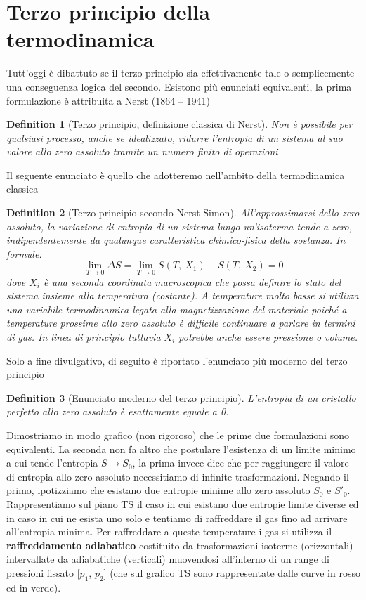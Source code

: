 \documentclass[10pt,a4paper]{article}
\newtheorem{definition}{Definition}
\begin{document}
\section{Terzo principio della termodinamica}\label{sec:terzo_principio}
Tutt'oggi è dibattuto se il terzo principio sia effettivamente tale o semplicemente una conseguenza logica del secondo. Esistono più enunciati equivalenti, la prima formulazione è attribuita a Nerst (1864 – 1941)
\begin{definition}[Terzo principio, definizione classica di Nerst]
	Non è possibile per qualsiasi processo, anche se idealizzato, ridurre l'entropia di un sistema al suo valore allo zero assoluto tramite un numero finito di operazioni 
\end{definition}
Il seguente enunciato è quello che adotteremo nell'ambito della termodinamica classica
\begin{definition}[Terzo principio secondo Nerst-Simon]
	All’approssimarsi dello zero assoluto, la variazione di entropia di un sistema lungo un’isoterma tende a zero, indipendentemente da qualunque caratteristica chimico-fisica della sostanza. In formule:
	\[\lim_{T\to 0} \Delta S = \lim_{T\to 0} S(T,\ X_1)-S(T,\ X_2) = 0\]
	dove \(X_i\) è una seconda coordinata macroscopica che possa definire lo stato del sistema insieme alla temperatura (costante). A temperature molto basse si utilizza una variabile termodinamica legata alla magnetizzazione del materiale poiché a temperature prossime allo zero assoluto è difficile continuare a parlare in termini di gas. In linea di principio tuttavia \(X_i \) potrebbe anche essere pressione o volume. 
\end{definition}
Solo a fine divulgativo, di seguito è riportato l'enunciato più moderno del terzo principio
\begin{definition}[Enunciato moderno del terzo principio]
	L'entropia di un cristallo perfetto allo zero assoluto è esattamente eguale a 0.
\end{definition}
Dimostriamo in modo grafico (non rigoroso) che le prime due formulazioni sono equivalenti. La seconda non fa altro che postulare l'esistenza di un limite minimo a cui tende l'entropia \(S\to S_0\), la prima invece dice che per raggiungere il valore di entropia allo zero assoluto necessitiamo di infinite trasformazioni. Negando il primo, ipotizziamo che esistano due entropie minime allo zero assoluto \(S_0\) e \(S'_0\). Rappresentiamo sul piano TS il caso in cui esistano due entropie limite diverse ed in caso in cui ne esista uno solo e tentiamo di raffreddare il gas fino ad arrivare all'entropia minima. Per raffreddare a queste temperature i gas si utilizza il \textbf{raffreddamento adiabatico} costituito da trasformazioni isoterme (orizzontali) intervallate da adiabatiche (verticali) muovendosi all'interno di un range di pressioni fissato [\(p_1\), \(p_2\)] (che sul grafico TS sono rappresentate dalle curve in rosso ed in verde). \\
\end{document}
